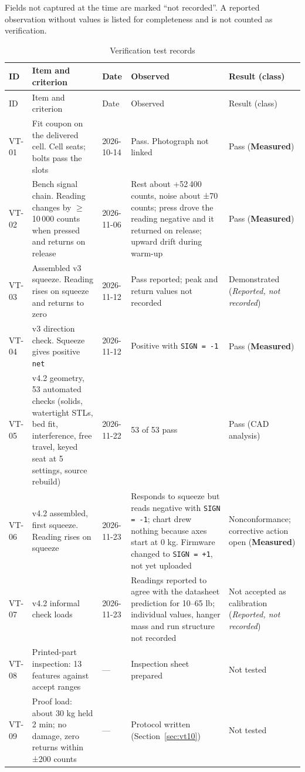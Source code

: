 \documentclass[10pt,a4paper]{article}
\newcommand{\meas}{\textbf{Measured}}
\newcommand{\cadan}{CAD analysis}
\newcommand{\rep}{\textit{Reported, not recorded}}
\newcommand{\nt}{\textcolor{warn}{Not tested}}
\begin{document}
Fields not captured at the time are marked ``not recorded''. A reported observation without values is listed for completeness and is not counted as verification.

\begin{small}
\begin{longtable}{@{}p{1.1cm}P{3.3cm}p{1.6cm}P{5.2cm}P{2.6cm}@{}}
\caption{Verification test records}\\
\toprule
ID & Item and criterion & Date & Observed & Result (class) \\
\midrule
\endfirsthead
\toprule
ID & Item and criterion & Date & Observed & Result (class) \\
\midrule
\endhead
VT-01 & Fit coupon on the delivered cell. Cell seats; bolts pass the slots & 2026-10-14 & Pass. Photograph not linked & Pass (\meas) \\
VT-02 & Bench signal chain. Reading changes by $\geq$ 10\,000 counts when pressed and returns on release & 2026-11-06 & Rest about +52\,400 counts, noise about ±70 counts; press drove the reading negative and it returned on release; upward drift during warm-up & Pass (\meas) \\
VT-03 & Assembled v3 squeeze. Reading rises on squeeze and returns to zero & 2026-11-12 & Pass reported; peak and return values not recorded & Demonstrated (\rep) \\
VT-04 & v3 direction check. Squeeze gives positive \texttt{net} & 2026-11-12 & Positive with \texttt{SIGN = -1} & Pass (\meas) \\
VT-05 & v4.2 geometry, 53 automated checks (solids, watertight STLs, bed fit, interference, free travel, keyed seat at 5 settings, source rebuild) & 2026-11-22 & 53 of 53 pass & Pass (\cadan) \\
VT-06 & v4.2 assembled, first squeeze. Reading rises on squeeze & 2026-11-23 & Responds to squeeze but reads negative with \texttt{SIGN = -1}; chart drew nothing because axes start at 0 kg. Firmware changed to \texttt{SIGN = +1}, not yet uploaded & Nonconformance; corrective action open (\meas) \\
VT-07 & v4.2 informal check loads & 2026-11-23 & Readings reported to agree with the datasheet prediction for 10–65 lb; individual values, hanger mass and run structure not recorded & Not accepted as calibration (\rep) \\
VT-08 & Printed-part inspection: 13 features against accept ranges & — & Inspection sheet prepared & \nt \\
VT-09 & Proof load: about 30 kg held 2 min; no damage, zero returns within ±200 counts & — & Protocol written (Section~\ref{sec:vt10}) & \nt \\

\end{longtable}
\end{small}
\end{document}
